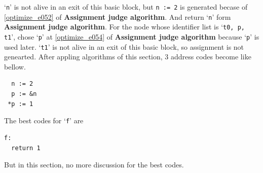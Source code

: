 \begin{Example}
`{\tt{n}}' is not alive in an exit of this basic block,
but {\tt{n := 2}} is generated becase of \ref{optimize_e052}
of {\bf Assignment judge algorithm}. And return `{\tt{n}}'
form {\bf Assignment judge algorithm}.
For the node whose identifier list is `{\tt{t0, p, t1}}',
chose `{\tt{p}}' at \ref{optimize_e054} of {\bf Assignment judge
 algorithm} because `{\tt{p}}' is used later.
`{\tt{t1}}' is not alive in an exit of this basic block,
so assignment is not genearted.
After appling algorithms of this section,
3 address codes become like bellow.
\begin{verbatim}
  n := 2
  p := &n
 *p := 1
\end{verbatim}
The best codes for `{\tt{f}}' are
\begin{verbatim}
f:
  return 1
\end{verbatim}
But in this section, no more discussion for the best codes.
\end{Example}

